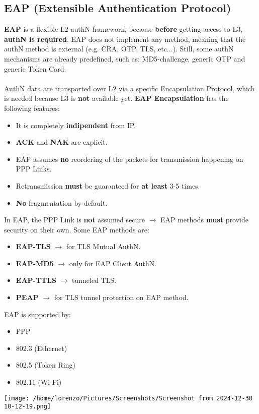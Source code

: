 \subsection{EAP (Extensible Authentication Protocol)}
\textbf{EAP} is a flexible L2 authN framework, because \textbf{before} getting access to L3, \textbf{authN is required}. EAP does not implement any method, meaning that the authN method is external
(e.g. CRA, OTP, TLS, etc...). Still, some authN mechanisms are already predefined, such as: MD5-challenge, generic OTP and generic Token Card.\\    \\    
AuthN data are transported over L2 via a specific Encapsulation Protocol, which is needed because L3 is \textbf{not} available yet. \textbf{EAP Encapsulation} has the following features:
\begin{itemize}
    \item It is completely \textbf{indipendent} from IP.
    \item \textbf{ACK} and \textbf{NAK} are explicit.
    \item EAP assumes \textbf{no} reordering of the packets for transmission happening on PPP Links.
    \item Retransmission \textbf{must} be guaranteed for \textbf{at least} 3-5 times.
    \item \textbf{No} fragmentation by default.
\end{itemize}
In EAP, the PPP Link is \textbf{not} assumed secure \(\rightarrow \) EAP methods \textbf{must} provide security on their own. Some EAP methods are:
\begin{itemize}
    \item \textbf{EAP-TLS} \(\rightarrow \) for TLS Mutual AuthN.
    \item \textbf{EAP-MD5} \(\rightarrow \) only for EAP Client AuthN.
    \item \textbf{EAP-TTLS} \(\rightarrow \) tunneled TLS.
    \item \textbf{PEAP} \(\rightarrow \) for TLS tunnel protection on EAP method.
\end{itemize}
\begin{minipage}{0.3\textwidth}
    EAP is supported by: 
    \begin{itemize}
        \item PPP
        \item 802.3 (Ethernet)
        \item 802.5 (Token Ring)
        \item 802.11 (Wi-Fi)
    \end{itemize}
\end{minipage} 
\hspace{0.3cm}
\begin{minipage}{0.4\textwidth}
    
    \texttt{[image: /home/lorenzo/Pictures/Screenshots/Screenshot from 2024-12-30 10-12-19.png]}
\end{minipage}
\\
\\
\noindent{\color{gray!50}\rule{\textwidth}{0.5pt}}
